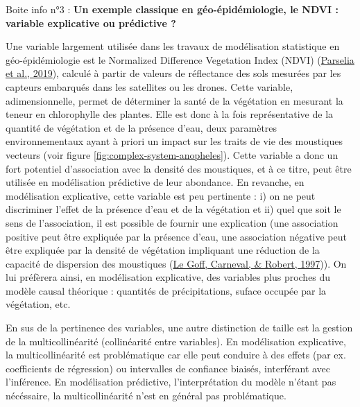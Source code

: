 \documentclass[12pt,twoside]{reedthesis}
\begin{document}
\begin{lightcyanbox}
\begin{center}
Boite info n°3 : \textbf{Un exemple classique en géo-épidémiologie, le NDVI : variable explicative ou prédictive ?}

\end{center}
Une variable largement utilisée dans les travaux de modélisation statistique en géo-épidémiologie est le Normalized Difference Vegetation Index (NDVI) (\protect\hyperlink{ref-parselia_satellite_2019}{Parselia et al., 2019}), calculé à partir de valeurs de réflectance des sols mesurées par les capteurs embarqués dans les satellites ou les drones. Cette variable, adimensionnelle, permet de déterminer la santé de la végétation en mesurant la teneur en chlorophylle des plantes. Elle est donc à la fois représentative de la quantité de végétation et de la présence d'eau, deux paramètres environnementaux ayant à priori un impact sur les traits de vie des moustiques vecteurs (voir figure \ref{fig:complex-system-anopheles}). Cette variable a donc un fort potentiel d'association avec la densité des moustiques, et à ce titre, peut être utilisée en modélisation prédictive de leur abondance. En revanche, en modélisation explicative, cette variable est peu pertinente : i) on ne peut discriminer l'effet de la présence d'eau et de la végétation et ii) quel que soit le sens de l'association, il est possible de fournir une explication (une association positive peut être expliquée par la présence d'eau, une association négative peut être expliquée par la densité de végétation impliquant une réduction de la capacité de dispersion des moustiques (\protect\hyperlink{ref-le_goff_low_1997}{Le Goff, Carneval, \& Robert, 1997})). On lui préfèrera ainsi, en modélisation explicative, des variables plus proches du modèle causal théorique : quantités de précipitations, suface occupée par la végétation, etc.

\end{lightcyanbox}
En sus de la pertinence des variables, une autre distinction de taille est la gestion de la multicollinéarité (collinéarité entre variables). En modélisation explicative, la multicollinéarité est problématique car elle peut conduire à des effets (par ex. coefficients de régression) ou intervalles de confiance biaisés, interférant avec l'inférence. En modélisation prédictive, l'interprétation du modèle n'étant pas nécéssaire, la multicollinéarité n'est en général pas problématique.\\
\end{document}
